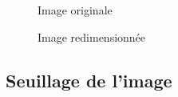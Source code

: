 \documentclass[french,a4paper,10pt]{article}
\begin{document}
	\begin{figure}[!htb]
		\begin{minipage}{0.48\textwidth}
			\centering
			\caption{Image originale}\label{Fig:orig-08}
		\end{minipage}\hfill
		\begin{minipage}{0.48\textwidth}
			\centering
			\caption{Image redimensionnée}\label{Fig:resize-08}
		\end{minipage}
	\end{figure}

	\subsection{Seuillage de l'image}\label{subsec:1.2}
\end{document}
